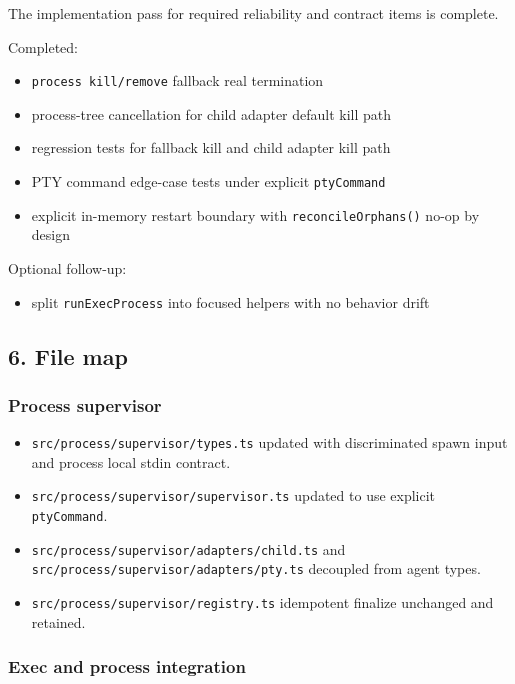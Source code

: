 The implementation pass for required reliability and contract items is complete.

Completed:

\begin{itemize}
  \item \texttt{process kill/remove} fallback real termination
  \item process-tree cancellation for child adapter default kill path
  \item regression tests for fallback kill and child adapter kill path
  \item PTY command edge-case tests under explicit \texttt{ptyCommand}
  \item explicit in-memory restart boundary with \texttt{reconcileOrphans()} no-op by design
\end{itemize}


Optional follow-up:

\begin{itemize}
  \item split \texttt{runExecProcess} into focused helpers with no behavior drift
\end{itemize}


\subsection{6. File map}


\subsubsection{Process supervisor}


\begin{itemize}
  \item \texttt{src/process/supervisor/types.ts} updated with discriminated spawn input and process local stdin contract.
  \item \texttt{src/process/supervisor/supervisor.ts} updated to use explicit \texttt{ptyCommand}.
  \item \texttt{src/process/supervisor/adapters/child.ts} and \texttt{src/process/supervisor/adapters/pty.ts} decoupled from agent types.
  \item \texttt{src/process/supervisor/registry.ts} idempotent finalize unchanged and retained.
\end{itemize}


\subsubsection{Exec and process integration}


